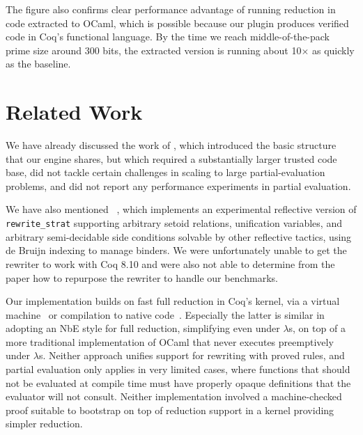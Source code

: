 The figure also confirms clear performance advantage of running reduction in code extracted to OCaml, which is possible because our plugin produces verified code in Coq's functional language.
By the time we reach middle-of-the-pack prime size around 300 bits, the extracted version is running about 10$\times$ as quickly as the baseline.




\section{Related Work}\label{sec:related}

We have already discussed the work of \textcite{Aehlig}, which introduced the basic structure that our engine shares, but which required a substantially larger trusted code base, did not tackle certain challenges in scaling to large partial-evaluation problems, and did not report any performance experiments in partial evaluation.

We have also mentioned \Rtac{}~\cite{rtac}, which implements an experimental reflective version of \texttt{rewrite\_strat} supporting arbitrary setoid relations, unification variables, and arbitrary semi-decidable side conditions solvable by other reflective tactics, using de Bruijn indexing to manage binders.
We were unfortunately unable to get the rewriter to work with Coq 8.10 and were also not able to determine from the paper how to repurpose the rewriter to handle our benchmarks.

Our implementation builds on fast full reduction in Coq's kernel, via a virtual machine~\cite{vmcompute} or compilation to native code~\cite{nativecompute}.
Especially the latter is similar in adopting an NbE style for full reduction, simplifying even under $\lambda$s, on top of a more traditional implementation of OCaml that never executes preemptively under $\lambda$s.
Neither approach unifies support for rewriting with proved rules, and partial evaluation only applies in very limited cases, where functions that should not be evaluated at compile time must have properly opaque definitions that the evaluator will not consult.
Neither implementation involved a machine-checked proof suitable to bootstrap on top of reduction support in a kernel providing simpler reduction.



